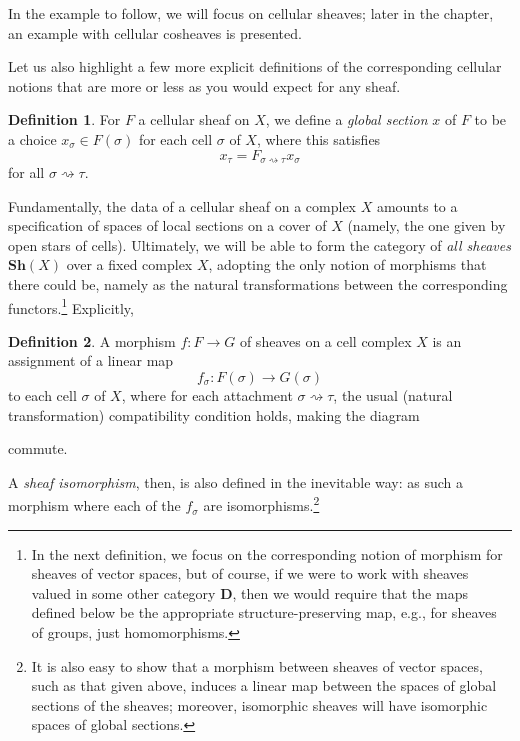 \documentclass[a4paper]{book}
\theoremstyle{definition}
\theoremstyle{definition}
\newtheorem{definition}{Definition}[section]
\theoremstyle{definition}
\theoremstyle{theorem}
\theoremstyle{definition}
\begin{document}
In the example to follow, we will focus on cellular sheaves; later in the chapter, an example with cellular cosheaves is presented. \par 
Let us also highlight a few more explicit definitions of the corresponding cellular notions that are more or less as you would expect for any sheaf.   
	\begin{definition}
		For $F$ a cellular sheaf on $X$, we define a \textit{global section} $x$ of $F$ to be a choice $x_{\sigma} \in F(\sigma)$ for each cell $\sigma$ of $X$, where this satisfies 
		\begin{equation*}
		x_{\tau} = F_{\sigma \rightsquigarrow \tau} x_{\sigma} 
		\end{equation*}
		for all $\sigma \rightsquigarrow \tau$. 
	\end{definition} \noindent 
Fundamentally, the data of a cellular sheaf on a complex $X$ amounts to a specification of spaces of local sections on a cover of $X$ (namely, the one given by open stars of cells). 
Ultimately, we will be able to form the category of \textit{all sheaves} $\textbf{Sh}(X)$ over a fixed complex $X$, adopting the only notion of morphisms that there could be, namely as the natural transformations between the corresponding functors.\footnote{In the next definition, we focus on the corresponding notion of morphism for sheaves of vector spaces, but of course, if we were to work with sheaves valued in some other category $\textbf{D}$, then we would require that the maps defined below be the appropriate structure-preserving map, e.g., for sheaves of groups, just homomorphisms.} Explicitly, 
\begin{definition}
	A morphism $f: F \rightarrow G$ of sheaves on a cell complex $X$ is an assignment of a linear map 
	\begin{equation*}
	f_{\sigma}: F(\sigma) \rightarrow G(\sigma)
	\end{equation*}
	to each cell $\sigma$ of $X$, where for each attachment $\sigma \rightsquigarrow \tau$, the usual (natural transformation) compatibility condition holds, making the diagram 
	\begin{center}
	\end{center} \par \noindent 
	commute. \par 
	A \textit{sheaf isomorphism}, then, is also defined in the inevitable way: as such a morphism where each of the $f_{\sigma}$ are isomorphisms.\footnote{It is also easy to show that a morphism between sheaves of vector spaces, such as that given above, induces a linear map between the spaces of global sections of the sheaves; moreover, isomorphic sheaves will have isomorphic spaces of global sections.} 
\end{definition} 
\end{document}
